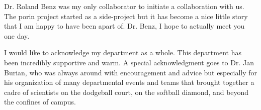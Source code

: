 Dr. Roland Benz was my only collaborator to initiate a collaboration with us. The porin project started as a side-project but it has become a nice little story that I am happy to have been apart of. Dr. Benz, I hope to actually meet you one day.

I would like to acknowledge my department as a whole. This department has been incredibly supportive and warm. A special acknowledgment goes to Dr. Jan Burian, who was always around with encouragement and advice but especially for his organization of many departmental events and teams that brought together a cadre of scientists on the dodgeball court, on the softball diamond, and beyond the confines of campus.

